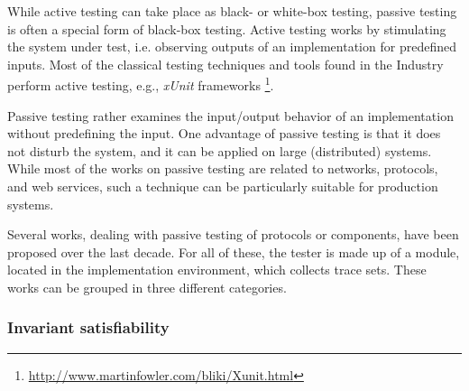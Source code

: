 While active testing can take place as black- or white-box
testing, passive testing is often a special form of black-box
testing. Active testing works by stimulating the system under
test, i.e. observing outputs of an implementation for predefined
inputs. Most of the classical testing techniques and tools found
in the Industry perform active testing, e.g., \textit{xUnit}
frameworks
\footnote{\url{http://www.martinfowler.com/bliki/Xunit.html}}.

Passive testing rather examines the input/output behavior of an
implementation without predefining the input. One advantage of
passive testing is that it does not disturb the system, and it
can be applied on large (distributed) systems. While most of the
works on passive testing are related to networks, protocols, and
web services, such a technique can be particularly suitable for
production systems.

Several works, dealing with passive testing of protocols or
components, have been proposed over the last decade. For all of
these, the tester is made up of a module, located in the
implementation environment, which collects trace sets. These
works can be grouped in three different categories.

\subsubsection{Invariant satisfiability}

